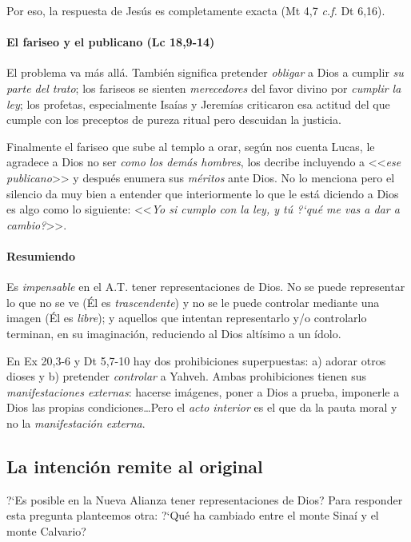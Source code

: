 \documentclass{article}
\begin{document}
Por eso, la respuesta de Jes\'us es completamente exacta (Mt 4,7 \emph{c.f.} Dt 6,16).

\paragraph{El fariseo y el publicano (Lc 18,9-14)}

El problema va m\'as all\'a. Tambi\'en significa pretender \emph{obligar} a Dios a cumplir \emph{su parte del trato}; los fariseos se sienten \emph{merecedores} del favor divino por \emph{cumplir la ley}; los profetas, especialmente Isa\'{i}as y Jerem\'{i}as criticaron esa actitud del que cumple con los preceptos de pureza ritual pero descuidan la justicia.

Finalmente el fariseo que sube al templo a orar, seg\'un nos cuenta Lucas, le agradece a Dios no ser \emph{como los dem\'as hombres}, los decribe incluyendo a <<\emph{ese publicano}>> y despu\'es enumera sus \emph{m\'eritos} ante Dios. No lo menciona pero el silencio da muy bien a entender que interiormente lo que le est\'a diciendo a Dios es algo como lo siguiente: <<\emph{Yo si cumplo con la ley, y t\'u ?`qu\'e me vas a dar a cambio?}>>.

\paragraph{Resumiendo}

Es \emph{impensable} en el A.T. tener representaciones de Dios. No se puede representar lo que no se ve (\'El es \emph{trascendente}) y no se le puede controlar mediante una imagen (\'El es \emph{libre}); y aquellos que intentan representarlo y/o controlarlo terminan, en su imaginaci\'on, reduciendo al Dios alt\'{i}simo a un \'{i}dolo.

En Ex 20,3-6 y Dt 5,7-10 hay dos prohibiciones superpuestas: a) adorar otros dioses y b) pretender \emph{controlar} a Yahveh. Ambas prohibiciones tienen sus \emph{manifestaciones externas}: hacerse im\'agenes, poner a Dios a prueba, imponerle a Dios las propias condiciones\ldots Pero el \emph{acto interior} es el que da la pauta moral y no la \emph{manifestaci\'on externa}.

\subsection{La intenci\'on remite al original}

?`Es posible en la Nueva Alianza tener representaciones de Dios? Para responder esta pregunta planteemos otra: ?`Qu\'e ha cambiado entre el monte Sina\'{i} y el monte Calvario?
\end{document}
